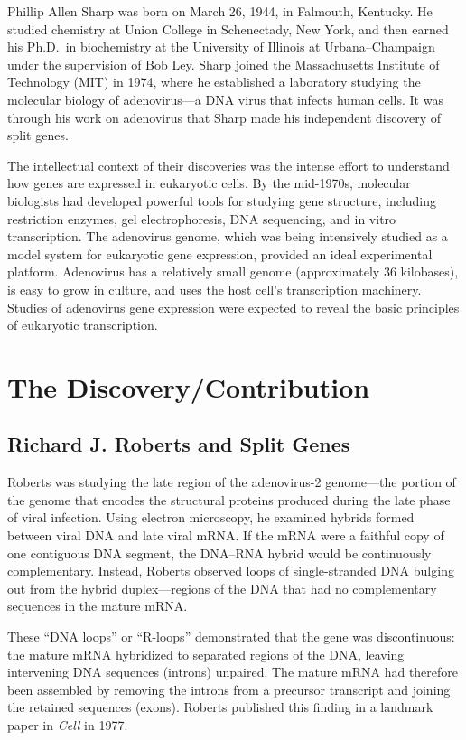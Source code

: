 Phillip Allen Sharp was born on March 26, 1944, in Falmouth, Kentucky. He studied chemistry at Union College in Schenectady, New York, and then earned his Ph.D.\ in biochemistry at the University of Illinois at Urbana--Champaign under the supervision of Bob Ley. Sharp joined the Massachusetts Institute of Technology (MIT) in 1974, where he established a laboratory studying the molecular biology of adenovirus---a DNA virus that infects human cells. It was through his work on adenovirus that Sharp made his independent discovery of split genes.

The intellectual context of their discoveries was the intense effort to understand how genes are expressed in eukaryotic cells. By the mid-1970s, molecular biologists had developed powerful tools for studying gene structure, including restriction enzymes, gel electrophoresis, DNA sequencing, and in vitro transcription. The adenovirus genome, which was being intensively studied as a model system for eukaryotic gene expression, provided an ideal experimental platform. Adenovirus has a relatively small genome (approximately 36 kilobases), is easy to grow in culture, and uses the host cell's transcription machinery. Studies of adenovirus gene expression were expected to reveal the basic principles of eukaryotic transcription.

\section{The Discovery/Contribution}

\subsection{Richard J. Roberts and Split Genes}

Roberts was studying the late region of the adenovirus-2 genome---the portion of the genome that encodes the structural proteins produced during the late phase of viral infection. Using electron microscopy, he examined hybrids formed between viral DNA and late viral mRNA. If the mRNA were a faithful copy of one contiguous DNA segment, the DNA--RNA hybrid would be continuously complementary. Instead, Roberts observed loops of single-stranded DNA bulging out from the hybrid duplex---regions of the DNA that had no complementary sequences in the mature mRNA.

These ``DNA loops'' or ``R-loops'' demonstrated that the gene was discontinuous: the mature mRNA hybridized to separated regions of the DNA, leaving intervening DNA sequences (introns) unpaired. The mature mRNA had therefore been assembled by removing the introns from a precursor transcript and joining the retained sequences (exons). Roberts published this finding in a landmark paper in \textit{Cell} in 1977.

